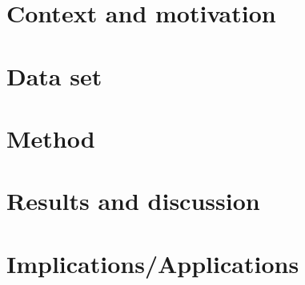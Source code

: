 \documentclass[11pt]{article}
\begin{document}

\pagebreak{}


\tableofcontents
{}
\setcounter{page}{2}
\pagebreak{}


\listoftables
\pagebreak{}


\setcounter{page}{1}


\section{Context and motivation}



\section{Data set}



\section{Method}



\section{Results and discussion}



\section{Implications/Applications}



\newpage




\end{document}
